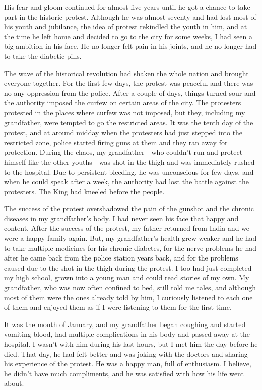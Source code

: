\documentclass[oneside,12pt]{book}
\begin{document}
His fear and gloom continued for almost five years until he got a chance to take part in the historic protest. Although he was almost seventy and had lost most of his youth and jubilance, the idea of protest rekindled the youth in him, and at the time he left home and decided to go to the city for some weeks, I had seen a big ambition in his face. He no longer felt pain in his joints, and he no longer had to take the diabetic pills. 

The wave of the historical revolution had shaken the whole nation and brought everyone together. For the first few days, the protest was peaceful and there was no any oppression from the police. After a couple of days, things turned sour and the authority imposed the curfew on certain areas of the city. The protesters protested in the places where curfew was not imposed, but they, including my grandfather, were tempted to go the restricted areas. It was the tenth day of the protest, and at around midday when the protesters had just stepped into the restricted zone, police started firing guns at them and they ran away for protection. During the chaos, my grandfather—who couldn’t run and protect himself like the other youths—was shot in the thigh and was immediately rushed to the hospital. Due to persistent bleeding, he was unconscious for few days, and when he could speak after a week, the authority had lost the battle against the protesters. The King had kneeled before the people. 

The success of the protest overshadowed the pain of the gunshot and the chronic diseases in my grandfather’s body. I had never seen his face that happy and content. After the success of the protest, my father returned from India and we were a happy family again. But, my grandfather’s health grew weaker and he had to take multiple medicines for his chronic diabetes, for the nerve problems he had after he came back from the police station years back, and for the problems caused due to the shot in the thigh during the protest. I too had just completed my high school, grown into a young man and could read stories of my own. My grandfather, who was now often confined to bed, still told me tales, and although most of them were the ones already told by him, I curiously listened to each one of them and enjoyed them as if I were listening to them for the first time. 

It was the month of January, and my grandfather began coughing and started vomiting blood, had multiple complications in his body and passed away at the hospital. I wasn’t with him during his last hours, but I met him the day before he died. That day, he had felt better and was joking with the doctors and sharing his experience of the protest. He was a happy man, full of enthusiasm. I believe, he didn’t have much compliments, and he was satisfied with how his life went about. 
\end{document}
